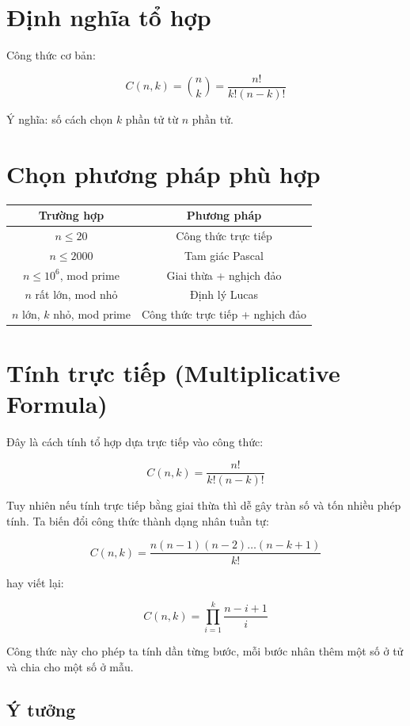 \section{Định nghĩa tổ hợp}

Công thức cơ bản:

\[
C(n,k) = \binom{n}{k} = \frac{n!}{k!(n-k)!}
\]

Ý nghĩa: số cách chọn $k$ phần tử từ $n$ phần tử.

\section{Chọn phương pháp phù hợp}

\begin{center}
\begin{tabular}{|c|c|}
\hline
Trường hợp & Phương pháp \\
\hline
$n \le 20$ & Công thức trực tiếp \\
\hline
$n \le 2000$ & Tam giác Pascal \\
\hline
$n \le 10^6$, mod prime & Giai thừa + nghịch đảo \\
\hline
$n$ rất lớn, mod nhỏ & Định lý Lucas \\
\hline
$n$ lớn, $k$ nhỏ, mod prime & Công thức trực tiếp + nghịch đảo \\
\hline
\end{tabular}
\end{center}

\newpage

\section{Tính trực tiếp (Multiplicative Formula)}

Đây là cách tính tổ hợp dựa trực tiếp vào công thức:

\[
C(n,k) = \frac{n!}{k!(n-k)!}
\]

Tuy nhiên nếu tính trực tiếp bằng giai thừa thì dễ gây tràn số và tốn nhiều phép tính.  
Ta biến đổi công thức thành dạng nhân tuần tự:

\[
C(n,k) =
\frac{n(n-1)(n-2)\dots(n-k+1)}{k!}
\]

hay viết lại:

\[
C(n,k) =
\prod_{i=1}^{k} \frac{n-i+1}{i}
\]

Công thức này cho phép ta tính dần từng bước, mỗi bước nhân thêm một số ở tử và chia cho một số ở mẫu.

\subsection*{Ý tưởng}


